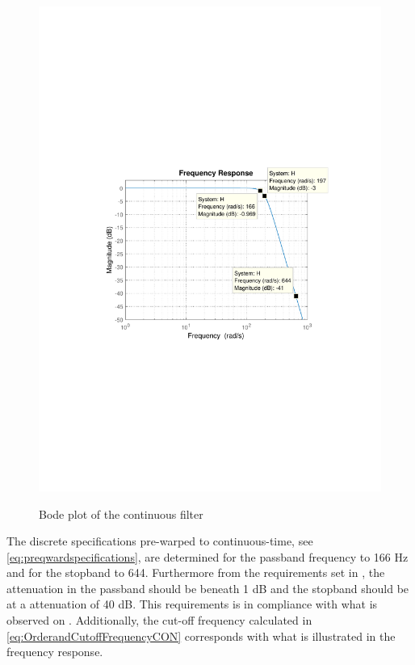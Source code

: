 \begin{figure}[H]
  \centering
  {
    \includegraphics[width=1.1\textwidth]{figures/ContinusFilterResponse.pdf}
  }
  \caption{Bode plot of the continuous filter}
  \label{fig:Continuoustimebodeplot}
\end{figure}\vspace{-5mm}
%
The discrete specifications pre-warped to continuous-time, see \eqref{eq:preqwardspecifications}, are determined for the passband frequency to 166 \si{Hz} and for the stopband to \si{644}. Furthermore from the requirements set in , the attenuation in the passband should be beneath 1 \si{dB} and the stopband should be at a attenuation of 40 \si{dB}. This requirements is in compliance with what is observed on . Additionally, the cut-off frequency calculated in \eqref{eq:OrderandCutoffFrequencyCON} corresponds with what is illustrated in the frequency response.

